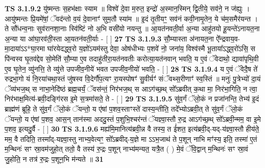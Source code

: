 \documentclass[17pt]{extarticle}
\begin{document}
                                \textbf{ TS 3.1.9.2} \newline
                  यु॑ष्मन्तः स॒हभ॑क्षाः स्याम ॥ विश्वे॑ दे॒वा म॒रुत॒ इन्द्रो॑ अ॒स्मान॒स्मिन् द्वि॒तीये॒ सव॑ने॒ न ज॑ह्युः । आयु॑ष्मन्तः प्रि॒यमे॑षां॒ ॅवद॑न्तो व॒यं दे॒वानाꣳ॑ सुम॒तौ स्या॑म ॥ इ॒दं तृ॒तीयꣳ॒॒ सव॑नं कवी॒नामृ॒तेन॒ ये च॑म॒समैर॑यन्त । ते सौ॑धन्व॒नाः सुव॑रानशा॒नाः स्वि॑ष्टिं नो अ॒भि वसी॑यो नयन्तु ॥ आ॒यत॑नवती॒र्वा अ॒न्या आहु॑तयो हू॒यन्ते॑ऽनायत॒ना अ॒न्या या आ॑घा॒रव॑ती॒स्ता आ॒यतन॑वती॒र्याः - [  ] \textbf{  27} \newline
                  \newline
                                \textbf{ TS 3.1.9.3} \newline
                  सौ॒म्यास्ता अ॑नायत॒ना ऐ᳚न्द्रवाय॒व-मा॒दाया॑ऽऽ*घा॒रमा घा॑रयेदद्ध्व॒रो य॒ज्ञो॑ऽयम॑स्तु देवा॒ ओष॑धीभ्यः प॒शवे॑ नो॒ जना॑य॒ विश्व॑स्मै भू॒ताया᳚ऽद्ध्व॒रो॑ऽसि॒ स पि॑न्वस्व घृ॒तव॑द्देव सो॒मेति॑ सौ॒म्या ए॒व तदाहु॑तीरा॒यत॑नवतीः करोत्या॒यत॑नवान् भवति॒ य ए॒वं ॅवेदाथो॒ द्यावा॑पृथि॒वी ए॒व घृ॒तेन॒ व्यु॑नत्ति॒ ते व्यु॑त्ते उपजीव॒नीये॑ भवत उपजीव॒नीयो॑ भवति॒ - [  ] \textbf{  28} \newline
                  \newline
                                \textbf{ TS 3.1.9.4} \newline
                  य ए॒वं ॅवेदै॒ष ते॑ रुद्रभा॒गो यं नि॒रया॑चथा॒स्तं जु॑षस्व वि॒देर्गौ॑प॒त्यꣳ रा॒यस्पोषꣳ॑ सु॒वीर्यꣳ॑ संॅवथ्स॒रीणाꣳ॑ स्व॒स्तिं ॥ मनुः॑ पु॒त्रेभ्यो॑ दा॒यं ॅव्य॑भज॒थ् स नाभा॒नेदि॑ष्ठं ब्रह्म॒चर्यं॒ ॅवस॑न्तं॒ निर॑भज॒थ् स आऽग॑च्छ॒थ् सो᳚ऽब्रवीत् क॒था मा॒ निर॑भा॒गिति॒ न त्वा॒ निर॑भाक्ष॒मित्य॑-ब्रवी॒दङ्गि॑रस इ॒मे स॒त्रमा॑सते॒ ते - [  ] \textbf{  29} \newline
                  \newline
                                \textbf{ TS 3.1.9.5} \newline
                  सु॑व॒र्गं ॅलो॒कं न प्रजा॑नन्ति॒ तेभ्य॑ इ॒दं ब्राह्म॑णं ब्रूहि॒ ते सु॑व॒र्गं ॅलो॒कं ॅयन्तो॒ य ए॑षां प॒शव॒स्ताꣳस्ते॑ दास्य॒न्तीति॒ तदे᳚भ्योऽब्रवी॒त् ते सु॑व॒र्गं ॅलो॒कं ॅयन्तो॒ य ए॑षां प॒शव॒ आस॒न् तान॑स्मा अददु॒स्तं प॒शुभि॒श्चर॑न्तं ॅयज्ञ्वा॒स्तौ रु॒द्र आऽग॑च्छ॒थ् सो᳚ऽब्रवी॒न्मम॒ वा इ॒मे प॒शव॒ इत्यदु॒र्वै - [  ] \textbf{  30} \newline
                  \newline
                                \textbf{ TS 3.1.9.6} \newline
                  मह्य॑मि॒मानित्य॑ब्रवी॒न्न वै तस्य॒ त ई॑शत॒ इत्य॑ब्रवी॒द्-यद्-य॑ज्ञ्वा॒स्तौ हीय॑ते॒ मम॒ वै तदिति॒ तस्मा᳚द्-यज्ञ्वा॒स्तु नाभ्य॒वेत्यꣳ॒॒ सो᳚ऽब्रवीद्-य॒ज्ञे मा ऽऽभ॒जाथ॑ ते प॒शून् नाभि मꣳ॑स्य॒ इति॒ तस्मा॑ ए॒तं म॒न्थिनः॑ सꣳ स्रा॒वम॑जुहो॒त् ततो॒ वै तस्य॑ रु॒द्रः प॒शून् नाभ्य॑मन्यत॒ यत्रै॒त ( ) मे॒वं ॅवि॒द्वान् म॒न्थिनः॑ सꣳ स्रा॒वं जु॒होति॒ न तत्र॑ रु॒द्रः प॒शून॒भि म॑न्यते ॥ \textbf{  31} \newline
\end{document}
